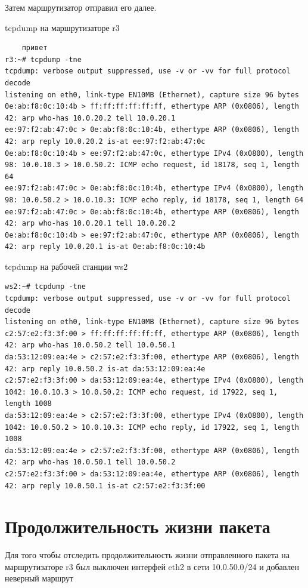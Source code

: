 \documentclass[a4paper,12pt]{article}
\begin{document}
Затем маршрутизатор отправил его далее.

tcpdump на маршрутизаторе r3
\begin{Verbatim}
    привет
r3:~# tcpdump -tne
tcpdump: verbose output suppressed, use -v or -vv for full protocol decode
listening on eth0, link-type EN10MB (Ethernet), capture size 96 bytes
0e:ab:f8:0c:10:4b > ff:ff:ff:ff:ff:ff, ethertype ARP (0x0806), length 42: arp who-has 10.0.20.2 tell 10.0.20.1
ee:97:f2:ab:47:0c > 0e:ab:f8:0c:10:4b, ethertype ARP (0x0806), length 42: arp reply 10.0.20.2 is-at ee:97:f2:ab:47:0c
0e:ab:f8:0c:10:4b > ee:97:f2:ab:47:0c, ethertype IPv4 (0x0800), length 98: 10.0.10.3 > 10.0.50.2: ICMP echo request, id 18178, seq 1, length 64
ee:97:f2:ab:47:0c > 0e:ab:f8:0c:10:4b, ethertype IPv4 (0x0800), length 98: 10.0.50.2 > 10.0.10.3: ICMP echo reply, id 18178, seq 1, length 64
ee:97:f2:ab:47:0c > 0e:ab:f8:0c:10:4b, ethertype ARP (0x0806), length 42: arp who-has 10.0.20.1 tell 10.0.20.2
0e:ab:f8:0c:10:4b > ee:97:f2:ab:47:0c, ethertype ARP (0x0806), length 42: arp reply 10.0.20.1 is-at 0e:ab:f8:0c:10:4b
\end{Verbatim}

tcpdump на рабочей станции ws2
\begin{Verbatim}
ws2:~# tcpdump -tne
tcpdump: verbose output suppressed, use -v or -vv for full protocol decode
listening on eth0, link-type EN10MB (Ethernet), capture size 96 bytes
c2:57:e2:f3:3f:00 > ff:ff:ff:ff:ff:ff, ethertype ARP (0x0806), length 42: arp who-has 10.0.50.2 tell 10.0.50.1
da:53:12:09:ea:4e > c2:57:e2:f3:3f:00, ethertype ARP (0x0806), length 42: arp reply 10.0.50.2 is-at da:53:12:09:ea:4e
c2:57:e2:f3:3f:00 > da:53:12:09:ea:4e, ethertype IPv4 (0x0800), length 1042: 10.0.10.3 > 10.0.50.2: ICMP echo request, id 17922, seq 1, length 1008
da:53:12:09:ea:4e > c2:57:e2:f3:3f:00, ethertype IPv4 (0x0800), length 1042: 10.0.50.2 > 10.0.10.3: ICMP echo reply, id 17922, seq 1, length 1008
da:53:12:09:ea:4e > c2:57:e2:f3:3f:00, ethertype ARP (0x0806), length 42: arp who-has 10.0.50.1 tell 10.0.50.2
c2:57:e2:f3:3f:00 > da:53:12:09:ea:4e, ethertype ARP (0x0806), length 42: arp reply 10.0.50.1 is-at c2:57:e2:f3:3f:00

\end{Verbatim}

\section{Продолжительность жизни пакета}

Для того чтобы отследить продолжительность жизни отправленного пакета на маршрутизаторе r3 был выключен интерфей eth2 в сети 10.0.50.0/24 и добавлен неверный маршрут
\end{document}
